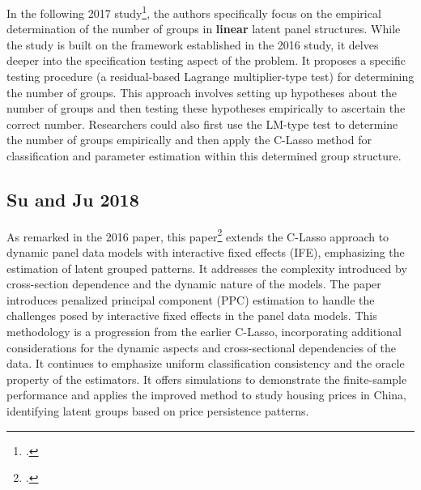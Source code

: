 \documentclass[UTF8,a4paper,10pt]{article}
\begin{document}
In the following 2017 study\Footcite{Lu2017}, the authors specifically focus on the empirical determination of the number of groups in \textbf{linear} latent panel structures. While the study is built on the framework established in the 2016 study, it delves deeper into the specification testing aspect of the problem.
It proposes a specific testing procedure (a residual-based Lagrange multiplier-type test) for determining the number of groups. This approach involves setting up hypotheses about the number of groups and then testing these hypotheses empirically to ascertain the correct number. 
Researchers could also first use the LM-type test to determine the number of groups empirically and then apply the C-Lasso method for classification and parameter estimation within this determined group structure.

\subsection{Su and Ju 2018}



As remarked in the 2016 paper, this paper\footcite{Su2018} extends the C-Lasso approach to dynamic panel data models with interactive fixed effects (IFE), emphasizing the estimation of latent grouped patterns. It addresses the complexity introduced by cross-section dependence and the dynamic nature of the models.
The paper introduces penalized principal component (PPC) estimation to handle the challenges posed by interactive fixed effects in the panel data models. This methodology is a progression from the earlier C-Lasso, incorporating additional considerations for the dynamic aspects and cross-sectional dependencies of the data. It continues to emphasize uniform classification consistency and the oracle property of the estimators.
It offers simulations to demonstrate the finite-sample performance and applies the improved method to study housing prices in China, identifying latent groups based on price persistence patterns​​.
\end{document}

